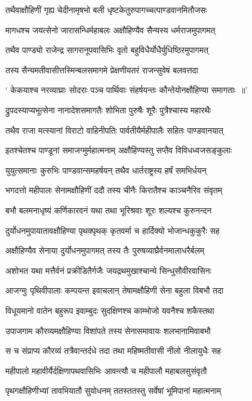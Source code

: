 \twolineshloka
{तथैवाक्षौहिणीं गृह्य चेदीनामृषभो बली}
{धृष्टकेतुरुपागच्चत्पाण्डवानमितौजसः}


\twolineshloka
{मागधश्च जयत्सेनो जारासन्धिर्महाबलः}
{अक्षौहिण्यैव सैन्यस्य धर्मराजमुपागमत्}


\twolineshloka
{तथैव पाण्ड्यो राजेन्द्र सागरानूपवासिभिः}
{वृतो बहुविधैर्योधैर्युधिष्ठिरमुपागमत्}


\twolineshloka
{तस्य सैन्यमतीवासीत्तस्मिन्बलसमागमे}
{प्रेक्षणीयतरं राजन्सुवेषं बलवत्तदा}


\twolineshloka
{` केकयाश्च नरव्याघ्राः सोदराः पञ्च पार्थिवाः}
{संहर्षयन्तः कौन्तेयोनक्षौहिण्या समागताः ॥'}


\twolineshloka
{द्रुपदस्याप्यभूत्सेना नानादेशसमागतैः}
{शोभिता पुरुषैः शूरैः पुत्रैश्चास्य महारथैः}


\twolineshloka
{तथैव राजा मत्स्यानां विराटो वाहिनीपतिः}
{पार्वतीयैर्महीपालैः सहितः पाण्डवानयात्}


\twolineshloka
{इतश्चेतश्च पाण्डूनां समाजग्मुर्महात्मनाम्}
{अक्षौहिण्यस्तु सप्तैव विविधध्वजसङ्कुलाः}


\twolineshloka
{युयुत्समानाः कुरुभिः पाण्डवान्समहर्षयन्}
{तथैव धार्तराष्ट्रस्य हर्षं समभिर्धयन्}


\twolineshloka
{भगदत्तो महीपालः सेनामक्षौहिणीं ददौ}
{तस्य चीनैः किरातैश्च काञ्चनैरिव संवृतम्}


\twolineshloka
{बभौ बलमनाधृष्यं कर्णिकारवनं यथा}
{तथा भूरिश्रवाः शूरः शल्यश्च कुरुनन्दन}


\twolineshloka
{दुर्योधनमुपायातावक्षौहिण्या पृथक्पृथक्}
{कृतवर्मा च हार्दिक्यो भोजान्धकुकुरैः सह}


\twolineshloka
{अक्षौहिण्यैव सेनाया दुर्योधनमुपागमत्}
{तस्य तैः पुरुषव्याघ्रैर्वनमालाधरैर्बलम्}


\twolineshloka
{अशोभत यथा मत्तैर्वनं प्रक्रीडितैर्गजैः}
{जयद्रथमुखाश्चान्ये सिन्धुसौवीरवासिनः}


\twolineshloka
{आजग्मुः पृथिवीपालाः कम्पयन्त इवाचलान्}
{तेषामक्षौहिणी सेना बहुला विबभौ तदा}


\twolineshloka
{विधूयमानो वातेन बहुरूप इवाम्बुदः}
{सुदक्षिणश्च काम्भोजो यवनैश्च शकैस्तथा}


\twolineshloka
{उपाजगाम कौरव्यमक्षौहिण्या विशांपते}
{तस्य सेनासमावायः शलभानामिवाबभौ}


\twolineshloka
{स च संप्राप्य कौरव्यं तत्रैवान्तर्दधे तदा}
{तथा महिष्मतीवासी नीलो नीलायुधैः सह}


\twolineshloka
{महीपालो महावीर्यैर्दक्षिणापथवासिभिः}
{आवन्त्यौ च महीपालौ महाबलसुसंवृतौ}


\twolineshloka
{पृथगक्षौहिणीभ्यां तावभियातौ सुयोधनम्}
{ततस्ततस्तु सर्वेषां भूमिपानां महात्मनाम्}


